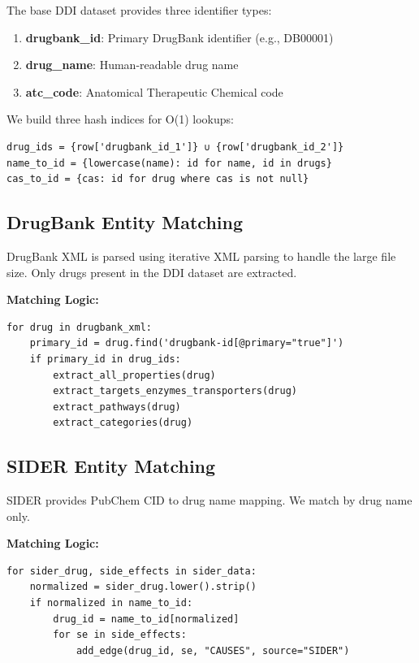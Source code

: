 \documentclass[11pt,a4paper]{article}
\begin{document}
The base DDI dataset provides three identifier types:
\begin{enumerate}
    \item \textbf{drugbank\_id}: Primary DrugBank identifier (e.g., DB00001)
    \item \textbf{drug\_name}: Human-readable drug name
    \item \textbf{atc\_code}: Anatomical Therapeutic Chemical code
\end{enumerate}

We build three hash indices for O(1) lookups:
\begin{verbatim}
drug_ids = {row['drugbank_id_1']} ∪ {row['drugbank_id_2']}
name_to_id = {lowercase(name): id for name, id in drugs}
cas_to_id = {cas: id for drug where cas is not null}
\end{verbatim}

\subsection{DrugBank Entity Matching}

DrugBank XML is parsed using iterative XML parsing to handle the large file size.
Only drugs present in the DDI dataset are extracted.

\textbf{Matching Logic:}
\begin{verbatim}
for drug in drugbank_xml:
    primary_id = drug.find('drugbank-id[@primary="true"]')
    if primary_id in drug_ids:
        extract_all_properties(drug)
        extract_targets_enzymes_transporters(drug)
        extract_pathways(drug)
        extract_categories(drug)
\end{verbatim}

\subsection{SIDER Entity Matching}

SIDER provides PubChem CID to drug name mapping. We match by drug name only.

\textbf{Matching Logic:}
\begin{verbatim}
for sider_drug, side_effects in sider_data:
    normalized = sider_drug.lower().strip()
    if normalized in name_to_id:
        drug_id = name_to_id[normalized]
        for se in side_effects:
            add_edge(drug_id, se, "CAUSES", source="SIDER")
\end{verbatim}
\end{document}
